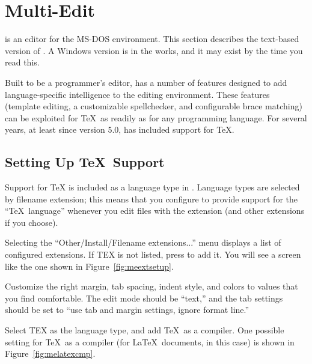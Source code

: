 \section{Multi-Edit}

 is an 
editor for the MS-DOS environment.  This section describes
the text-based version of .  A Windows version is in the works, and
it may exist by the time you read this.

Built to be a programmer's editor,  has a number of features
designed to add language-specific intelligence to the editing environment.
These features (template editing, a customizable spellchecker, and
configurable brace matching) can be exploited for \TeX\ as readily as for
any programming language.  For several years, at least since version 5.0,
 has included support for \TeX.

\subsection{Setting Up \protect\TeX\ Support}

Support for \TeX{} is 
included as a language type in .
Language types are selected by filename extension; this means that you
configure  to provide support for the ``\TeX\ language'' whenever
you edit files with the 
extension  (and 
other extensions if you choose).

Selecting the ``Other/Install/Filename extensions...'' menu displays
a list of configured extensions.  If TEX is not listed,
press  to add it.  You will see a screen like the one shown
in Figure~\ref{fig:meextsetup}.


\pagebreak
Customize the right margin, tab spacing, indent style, and 
colors to values that you find comfortable.  The edit mode should 
be ``text,'' and the tab settings should be set to ``use tab and margin 
settings, ignore format line.''

Select TEX as the language type, and add \TeX\ as a
compiler.  One possible setting for \TeX\ as a compiler (for \LaTeX\
documents, in this case) is shown in Figure~\ref{fig:melatexcmp}.


